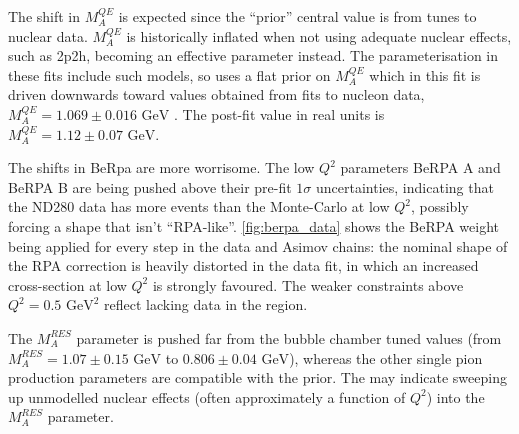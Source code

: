 The shift in $M_A^{QE}$ is expected since the ``prior'' central value is from tunes to nuclear data\cite{ccqe_tuning}. $M_A^{QE}$ is historically inflated\cite{k2k_ccqe_carbon,k2k_ccqe_oxygen,minos_ccqe_iron,miniboone_nu_ccqe} when not using adequate nuclear effects, such as 2p2h, becoming an effective parameter instead. The parameterisation in these fits include such models, so uses a flat prior on $M_A^{QE}$ which in this fit is driven downwards toward values obtained from fits to nucleon data, $M_A^{QE}=1.069\pm0.016\text{ GeV}$ \cite{maqe_fit}. The post-fit value in real units is $M_A^{QE}=1.12\pm0.07\text{ GeV}$.

The shifts in BeRpa are more worrisome. The low $Q^2$ parameters BeRPA A and BeRPA B are being pushed above their pre-fit $1\sigma$ uncertainties, indicating that the ND280 data has more events than the Monte-Carlo at low $Q^2$, possibly forcing a shape that isn't ``RPA-like''. \autoref{fig:berpa_data} shows the BeRPA weight being applied for every step in the data and Asimov chains: the nominal shape of the RPA correction is heavily distorted in the data fit, in which an increased cross-section at low $Q^2$ is strongly favoured. The weaker constraints above $Q^2=0.5\text{ GeV}^2$ reflect lacking data in the region.

The $M_A^{RES}$ parameter is pushed far from the bubble chamber tuned values (from $M_A^{RES}=1.07\pm0.15\text{ GeV}$ to $0.806\pm0.04\text{ GeV}$), whereas the other single pion production parameters are compatible with the prior. The may indicate sweeping up unmodelled nuclear effects (often approximately a function of $Q^2$) into the $M_A^{RES}$ parameter.

